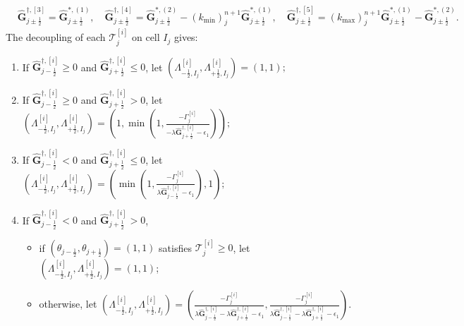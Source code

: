 \documentclass[times,final,11pt]{elsarticle}
\numberwithin{equation}{section}
\theoremstyle{definition}
\theoremstyle{remark}
\begin{document}
\begin{enumerate}[label=(\roman*),leftmargin=6mm]
\begin{equation*}
\begin{aligned}
			&\widehat{\mathbf{G}}_{j \pm \frac{1}{2}}^{\dag,[3]} = \widehat{\mathbf{G}}_{j \pm \frac{1}{2}}^{*,(1)}, \quad
			\widehat{\mathbf{G}}_{j \pm \frac{1}{2}}^{\dag,[4]} = \widehat{\mathbf{G}}_{j \pm \frac{1}{2}}^{*,(2)} - (k_{\min})_j^{n + 1}\widehat{\mathbf{G}}_{j \pm \frac{1}{2}}^{*,(1)}, \quad
			\widehat{\mathbf{G}}_{j \pm \frac{1}{2}}^{\dag,[5]} = (k_{\max})_j^{n + 1}\widehat{\mathbf{G}}_{j \pm \frac{1}{2}}^{*,(1)} - \widehat{\mathbf{G}}_{j \pm \frac{1}{2}}^{*,(2)}.
		\end{aligned}
	\end{equation*}
	The decoupling of each $\mathcal{T}_j^{[i]}$ on cell $I_j$ gives:
	\begin{enumerate}
		\item[(a)] If $\widehat{\mathbf{G}}_{j - \frac{1}{2}}^{\dag,[i]} \geq 0$ and $\widehat{\mathbf{G}}_{j + \frac{1}{2}}^{\dag,[i]} \leq 0$,
		let $(\Lambda_{- \frac{1}{2}, I_j}^{[i]}, \Lambda_{+ \frac{1}{2}, I_j}^{[i]}) = (1, 1);$
		\item[(b)] If $\widehat{\mathbf{G}}_{j - \frac{1}{2}}^{\dag,[i]} \geq 0$ and $\widehat{\mathbf{G}}_{j + \frac{1}{2}}^{\dag,[i]} > 0$,
		let $(\Lambda_{- \frac{1}{2}, I_j}^{[i]}, \Lambda_{+ \frac{1}{2}, I_j}^{[i]}) = (1, \min (1, \frac{-\Gamma_j^{[i]}}{-\lambda \widehat{\mathbf{G}}_{j + \frac{1}{2}}^{\dag,[i]} - \epsilon_1}));$
		\item[(c)] If $\widehat{\mathbf{G}}_{j - \frac{1}{2}}^{\dag,[i]} < 0$ and $\widehat{\mathbf{G}}_{j + \frac{1}{2}}^{\dag,[i]} \leq 0$,
		let $(\Lambda_{- \frac{1}{2}, I_j}^{[i]}, \Lambda_{+ \frac{1}{2}, I_j}^{[i]}) = (\min (1, \frac{-\Gamma_j^{[i]}}{\lambda \widehat{\mathbf{G}}_{j - \frac{1}{2}}^{\dag,[i]} - \epsilon_1}), 1);$
		\item[(d)] If $\widehat{\mathbf{G}}_{j - \frac{1}{2}}^{\dag,[i]} < 0$ and $\widehat{\mathbf{G}}_{j + \frac{1}{2}}^{\dag,[i]} > 0$, \\
		\begin{itemize}
			\item[--] \vspace{-1em} if $(\theta_{j - \frac12}, \theta_{j + \frac12}) = (1, 1)$ satisfies $\mathcal{T}_j^{[i]} \geq 0$, let $(\Lambda_{- \frac{1}{2}, I_j}^{[i]}, \Lambda_{+ \frac{1}{2}, I_j}^{[i]}) = (1, 1)$;
			\item[--] otherwise, let $(\Lambda_{- \frac{1}{2}, I_j}^{[i]}, \Lambda_{+ \frac{1}{2}, I_j}^{[i]}) = (\frac{-\Gamma_j^{[i]}}{\lambda \widehat{\mathbf{G}}_{j - \frac{1}{2}}^{\dag,[i]} - \lambda \widehat{\mathbf{G}}_{j + \frac{1}{2}}^{\dag,[i]} - \epsilon_1}, \frac{-\Gamma_j^{[i]}}{\lambda \widehat{\mathbf{G}}_{j - \frac{1}{2}}^{\dag,[i]} - \lambda \widehat{\mathbf{G}}_{j + \frac{1}{2}}^{\dag,[i]} - \epsilon_1})$.
		\end{itemize}
	\end{enumerate}


\end{enumerate}
\end{document}
